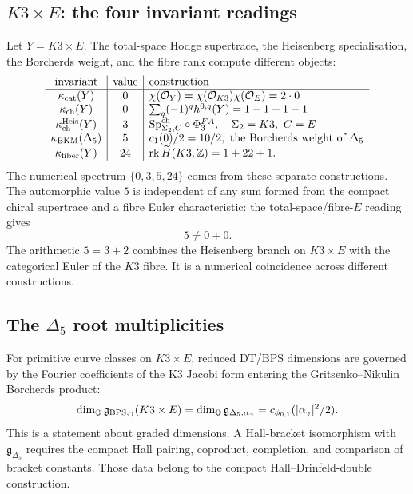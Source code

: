 \subsection{\texorpdfstring{\(K3\times E\)}{K3 x E}: the four invariant readings}
\label{wn:subsec:k3e-invariants}

Let \(Y=K3\times E\).  The total-space Hodge supertrace, the Heisenberg
specialisation, the Borcherds weight, and the fibre rank compute
different objects:
\[
\begin{array}{c|c|l}
\text{invariant} & \text{value} & \text{construction} \\
\hline
\kappa_{\mathrm{cat}}(Y) & 0
& \chi(\mathcal{O}_Y)=\chi(\mathcal{O}_{K3})\chi(\mathcal{O}_E)=2\cdot 0 \\
\kappa_{\mathrm{ch}}(Y) & 0
& \sum_q(-1)^q h^{0,q}(Y)=1-1+1-1 \\
\kappa_{\mathrm{ch}}^{\mathrm{Heis}}(Y) & 3
& \mathrm{Sp}^{\mathrm{ch}}_{\Sigma_2,C}\circ\Phi^{FA}_3,\quad
  \Sigma_2=K3,\ C=E \\
\kappa_{\mathrm{BKM}}(\Delta_5) & 5
& c_1(0)/2=10/2,\ \text{the Borcherds weight of }\Delta_5 \\
\kappa_{\mathrm{fiber}}(Y) & 24
& \operatorname{rk}\widetilde{H}(K3,\mathbb{Z})=1+22+1 .
\end{array}
\]
The numerical spectrum \(\{0,3,5,24\}\) comes from these separate
constructions.  The automorphic value \(5\) is independent of any sum
formed from the compact chiral supertrace and a fibre Euler
characteristic: the total-space/fibre-\(E\) reading gives
\[
 5\neq 0+0.
\]
The arithmetic \(5=3+2\) combines the Heisenberg branch on
\(K3\times E\) with the categorical Euler of the \(K3\) fibre. It is a
numerical coincidence across different constructions.

\subsection{The \texorpdfstring{\(\Delta_5\)}{Delta5} root multiplicities}
\label{wn:subsec:k3e-root-multiplicities}

For primitive curve classes on \(K3\times E\), reduced DT/BPS
dimensions are governed by the Fourier coefficients of the K3 Jacobi
form entering the Gritsenko--Nikulin Borcherds product:
\[
 \dim_{\mathbb{Q}}\mathfrak{g}_{\mathrm{BPS},\gamma}(K3\times E)
 =
 \dim_{\mathbb{Q}}\mathfrak{g}_{\Delta_5,\alpha_\gamma}
 =
 c_{\phi_{0,1}}(|\alpha_\gamma|^2/2).
\]
This is a statement about graded dimensions. A Hall-bracket isomorphism
with \(\mathfrak{g}_{\Delta_5}\) requires the compact Hall pairing,
coproduct, completion, and comparison of bracket constants. Those data
belong to the compact Hall--Drinfeld-double construction.

